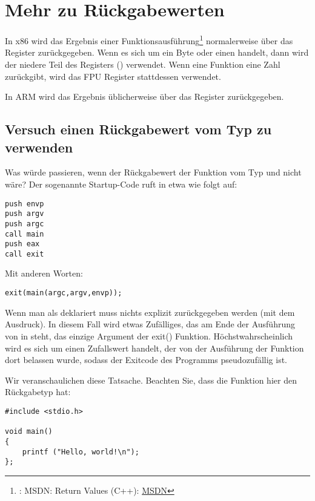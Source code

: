 \section{Mehr zu Rückgabewerten}

In x86 wird das Ergebnis einer Funktionsausführung\footnote{\Seealso: MSDN: Return Values (C++):
\href{http://go.yurichev.com/17258}{MSDN}} normalerweise über das \EAX Register zurückgegeben.
Wenn es sich um ein Byte oder einen \Tchar handelt, dann wird der niedere Teil des Registers \EAX (\AL) verwendet.
Wenn eine Funktion eine \Tfloat Zahl zurückgibt, wird das FPU Register  stattdessen verwendet.

In ARM wird das Ergebnis üblicherweise über das  Register zurückgegeben.

\subsection{Versuch einen Rückgabewert vom Typ \Tvoid zu verwenden}
Was würde passieren, wenn der Rückgabewert der Funktion \main vom Typ \Tvoid und nicht \Tint wäre?
Der sogenannte Startup-Code ruft \main in etwa wie folgt auf:

\begin{lstlisting}[style=customasmx86]
push envp
push argv
push argc
call main
push eax
call exit
\end{lstlisting}

Mit anderen Worten:

\begin{lstlisting}[style=customc]
exit(main(argc,argv,envp));
\end{lstlisting}
Wenn man \main als \Tvoid deklariert muss nichts explizit zurückgegeben werden (mit dem  Ausdruck). In diesem
Fall wird etwas Zufälliges, das am Ende der Ausführung von \main in \EAX steht, das einzige Argument der exit()
Funktion.
Höchstwahrscheinlich wird es sich um einen Zufallswert handelt, der von der Ausführung der Funktion dort belassen wurde,
sodass der Exitcode des Programms pseudozufällig ist.
\par
Wir veranschaulichen diese Tatsache. 
Beachten Sie, dass die Funktion \main hier den Rückgabetyp \Tvoid hat: 

\begin{lstlisting}[style=customc]
#include <stdio.h>

void main()
{
	printf ("Hello, world!\n");
};
\end{lstlisting}


